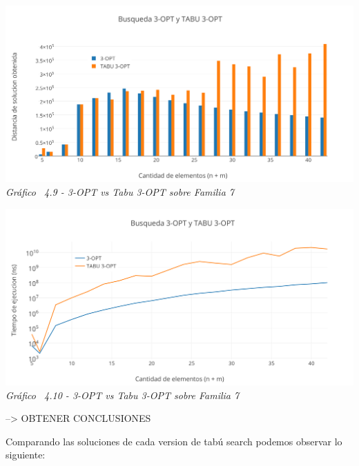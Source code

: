 \vspace*{0.3cm} \vspace*{0.3cm}
  \begin{center}
 \includegraphics[scale=0.5]{./EJ4/comparativoanillos3opt.png}\\
 {            \textit{Gráfico \ 4.9 - 3-OPT vs Tabu 3-OPT sobre Familia 7}}
  \end{center}
  \vspace*{0.3cm}

\vspace*{0.3cm} \vspace*{0.3cm}
  \begin{center}
 \includegraphics[scale=0.5]{./EJ4/medicionanillos3opt.png}\\
 {            \textit{Gráfico \ 4.10 - 3-OPT vs Tabu 3-OPT sobre Familia 7}}
  \end{center}
  \vspace*{0.3cm}
  
--> OBTENER CONCLUSIONES  
 
Comparando las soluciones de cada version de tabú search podemos observar lo siguiente: 
  
